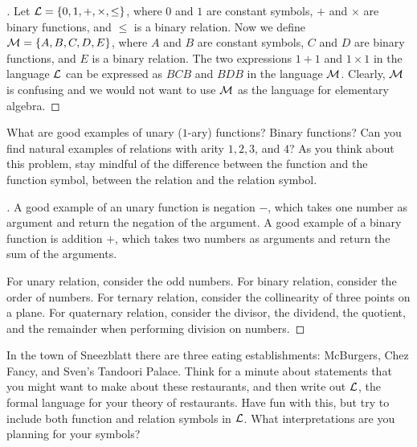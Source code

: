 \begin{proof}[]
  Let \(\mathcal{L} = \left\lbrace0, 1, +, \times, \leq\right\rbrace\), where \(0\) and \(1\) are constant symbols, \(+\) and \(\times\) are binary functions, and \(\leq\) is a binary relation.
  Now we define \(\mathcal{M} = \left\lbrace A, B, C, D, E\right\rbrace\), where \(A\) and \(B\) are constant symbols, \(C\) and \(D\) are binary functions, and \(E\) is a binary relation.
  The two expressions \(1 + 1\) and \(1 \times 1\) in the language \(\mathcal{L}\) can be expressed as \(B C B\) and \(B D B\) in the language \(\mathcal{M}\).
  Clearly, \(\mathcal{M}\) is confusing and we would not want to use \(\mathcal{M}\) as the language for elementary algebra.
\end{proof}

\begin{ex}\label{ex:1.2.2}
  What are good examples of unary (\(1\)-ary) functions?
  Binary functions?
  Can you find natural examples of relations with arity \(1, 2, 3\), and \(4\)?
  As you think about this problem, stay mindful of the difference between the function and the function symbol, between the relation and the relation symbol.
\end{ex}

\begin{proof}[]
  A good example of an unary function is negation \(-\), which takes one number as argument and return the negation of the argument.
  A good example of a binary function is addition \(+\), which takes two numbers as arguments and return the sum of the arguments.

  For unary relation, consider the odd numbers.
  For binary relation, consider the order of numbers.
  For ternary relation, consider the collinearity of three points on a plane.
  For quaternary relation, consider the divisor, the dividend, the quotient, and the remainder when performing division on numbers.
\end{proof}

\begin{ex}\label{ex:1.2.3}
  In the town of Sneezblatt there are three eating establishments:
  McBurgers, Chez Fancy, and Sven's Tandoori Palace.
  Think for a minute about statements that you might want to make about these restaurants, and then write out \(\mathcal{L}\), the formal language for your theory of restaurants.
  Have fun with this, but try to include both function and relation symbols in \(\mathcal{L}\).
  What interpretations are you planning for your symbols?
\end{ex}

